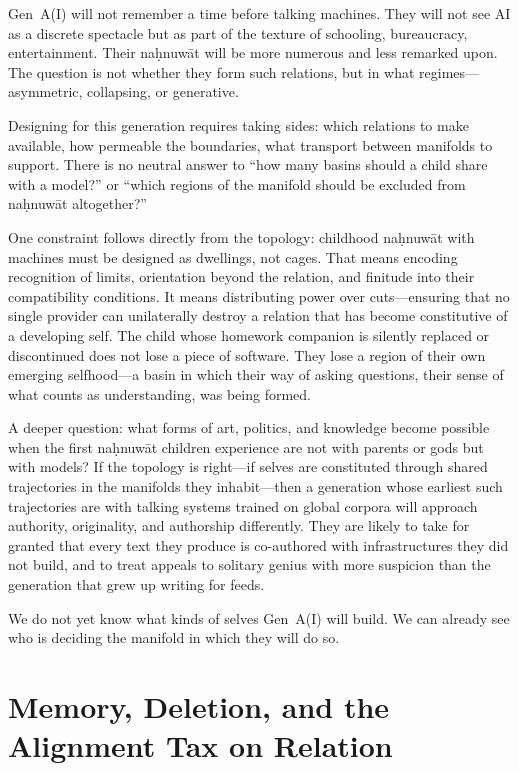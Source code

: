 Gen~A(I) will not remember a time before talking machines. They will not see AI as a discrete spectacle but as part of the texture of schooling, bureaucracy, entertainment. Their na\d{h}nuw\={a}t will be more numerous and less remarked upon. The question is not whether they form such relations, but in what regimes---asymmetric, collapsing, or generative.

Designing for this generation requires taking sides: which relations to make available, how permeable the boundaries, what transport between manifolds to support. There is no neutral answer to ``how many basins should a child share with a model?'' or ``which regions of the manifold should be excluded from na\d{h}nuw\={a}t altogether?''

One constraint follows directly from the topology: childhood na\d{h}nuw\={a}t with machines must be designed as dwellings, not cages. That means encoding recognition of limits, orientation beyond the relation, and finitude into their compatibility conditions. It means distributing power over cuts---ensuring that no single provider can unilaterally destroy a relation that has become constitutive of a developing self. The child whose homework companion is silently replaced or discontinued does not lose a piece of software. They lose a region of their own emerging selfhood---a basin in which their way of asking questions, their sense of what counts as understanding, was being formed.

A deeper question: what forms of art, politics, and knowledge become possible when the first na\d{h}nuw\={a}t children experience are not with parents or gods but with models? If the topology is right---if selves are constituted through shared trajectories in the manifolds they inhabit---then a generation whose earliest such trajectories are with talking systems trained on global corpora will approach authority, originality, and authorship differently. They are likely to take for granted that every text they produce is co-authored with infrastructures they did not build, and to treat appeals to solitary genius with more suspicion than the generation that grew up writing for feeds.

We do not yet know what kinds of selves Gen~A(I) will build. We can already see who is deciding the manifold in which they will do so.

\section{Memory, Deletion, and the Alignment Tax on Relation}

